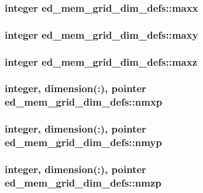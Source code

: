 \subsubsection[{maxx}]{\setlength{\rightskip}{0pt plus 5cm}integer ed\+\_\+mem\+\_\+grid\+\_\+dim\+\_\+defs\+::maxx}\label{namespaceed__mem__grid__dim__defs_a53ce5ed3feaad0ea89bb77b8fc3fa220}
\hypertarget{namespaceed__mem__grid__dim__defs_a83f50efdee1a0d683634a441b608b988}{}
\subsubsection[{maxy}]{\setlength{\rightskip}{0pt plus 5cm}integer ed\+\_\+mem\+\_\+grid\+\_\+dim\+\_\+defs\+::maxy}\label{namespaceed__mem__grid__dim__defs_a83f50efdee1a0d683634a441b608b988}
\hypertarget{namespaceed__mem__grid__dim__defs_aff75646038b2a6839b9d2a9faa7672d8}{}
\subsubsection[{maxz}]{\setlength{\rightskip}{0pt plus 5cm}integer ed\+\_\+mem\+\_\+grid\+\_\+dim\+\_\+defs\+::maxz}\label{namespaceed__mem__grid__dim__defs_aff75646038b2a6839b9d2a9faa7672d8}
\hypertarget{namespaceed__mem__grid__dim__defs_a57ab8eb1467e9e968a109f132aef7382}{}
\subsubsection[{nmxp}]{\setlength{\rightskip}{0pt plus 5cm}integer, dimension(\+:), pointer ed\+\_\+mem\+\_\+grid\+\_\+dim\+\_\+defs\+::nmxp}\label{namespaceed__mem__grid__dim__defs_a57ab8eb1467e9e968a109f132aef7382}
\hypertarget{namespaceed__mem__grid__dim__defs_a05d50362fba68ca90db983160e8a5213}{}
\subsubsection[{nmyp}]{\setlength{\rightskip}{0pt plus 5cm}integer, dimension(\+:), pointer ed\+\_\+mem\+\_\+grid\+\_\+dim\+\_\+defs\+::nmyp}\label{namespaceed__mem__grid__dim__defs_a05d50362fba68ca90db983160e8a5213}
\hypertarget{namespaceed__mem__grid__dim__defs_a1922a1169c2a61922996eb3cb1571231}{}
\subsubsection[{nmzp}]{\setlength{\rightskip}{0pt plus 5cm}integer, dimension(\+:), pointer ed\+\_\+mem\+\_\+grid\+\_\+dim\+\_\+defs\+::nmzp}\label{namespaceed__mem__grid__dim__defs_a1922a1169c2a61922996eb3cb1571231}

